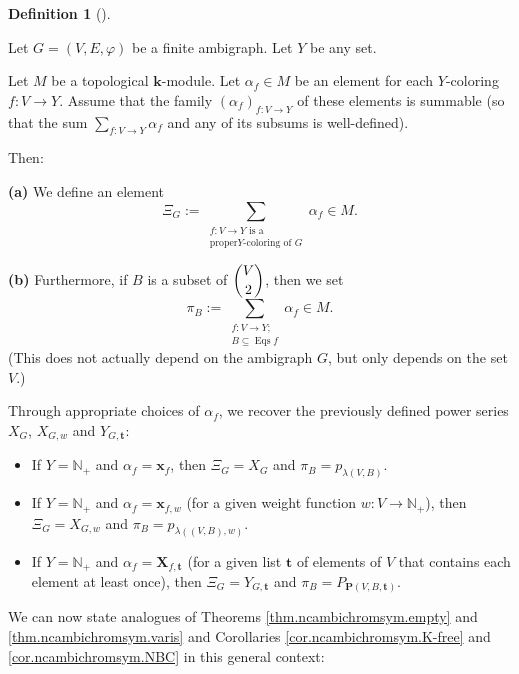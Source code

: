 \documentclass[numbers=enddot,12pt,final,onecolumn,notitlepage]{scrartcl}%
\theoremstyle{definition}
\newtheorem{defi}[theo]{Definition}
\newenvironment{definition}[1][]
{\begin{defi}[#1]\begin{leftbar}}
{\end{leftbar}\end{defi}}
\let\sumnonlimits\sum
\renewcommand{\sum}{\sumnonlimits\limits}
\begin{document}
\begin{definition}
\label{def.genambichrom}Let $G=\left(  V,E,\varphi\right)  $ be a finite
ambigraph. Let $Y$ be any set.

Let $M$ be a topological $\mathbf{k}$-module. Let $\alpha_{f}\in M$ be an
element for each $Y$-coloring $f:V\rightarrow Y$. Assume that the family
$\left(  \alpha_{f}\right)  _{f:V\rightarrow Y}$ of these elements is summable
(so that the sum $\sum_{f:V\rightarrow Y}\alpha_{f}$ and any of its subsums is well-defined).

Then:

\textbf{(a)} We define an element%
\[
\Xi_{G}:=\sum_{\substack{f:V\rightarrow Y\text{ is a}\\\text{proper
}Y\text{-coloring of }G}}\alpha_{f}\in M.
\]


\textbf{(b)} Furthermore, if $B$ is a subset of $\dbinom{V}{2}$, then we set%
\[
\pi_{B}:=\sum_{\substack{f:V\rightarrow Y;\\B\subseteq\operatorname*{Eqs}%
f}}\alpha_{f}\in M.
\]
(This does not actually depend on the ambigraph $G$, but only depends on the
set $V$.)
\end{definition}

Through appropriate choices of $\alpha_{f}$, we recover the previously defined
power series $X_{G}$, $X_{G,w}$ and $Y_{G,\mathbf{t}}$:

\begin{itemize}
\item If $Y=\mathbb{N}_{+}$ and $\alpha_{f}=\mathbf{x}_{f}$, then $\Xi
_{G}=X_{G}$ and $\pi_{B}=p_{\lambda\left(  V,B\right)  }$.

\item If $Y=\mathbb{N}_{+}$ and $\alpha_{f}=\mathbf{x}_{f,w}$ (for a given
weight function $w:V\rightarrow\mathbb{N}_{+}$), then $\Xi_{G}=X_{G,w}$ and
$\pi_{B}=p_{\lambda\left(  \left(  V,B\right)  ,w\right)  }$.

\item If $Y=\mathbb{N}_{+}$ and $\alpha_{f}=\mathbf{X}_{f,\mathbf{t}}$ (for a
given list $\mathbf{t}$ of elements of $V$ that contains each element at least
once), then $\Xi_{G}=Y_{G,\mathbf{t}}$ and $\pi_{B}=P_{\mathbf{P}\left(
V,B,\mathbf{t}\right)  }$.
\end{itemize}

We can now state analogues of Theorems \ref{thm.ncambichromsym.empty} and
\ref{thm.ncambichromsym.varis} and Corollaries \ref{cor.ncambichromsym.K-free}
and \ref{cor.ncambichromsym.NBC} in this general context:
\end{document}
